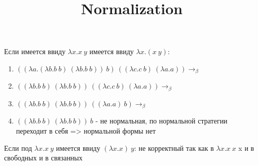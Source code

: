 \documentclass{article}
\title{Normalization}
\begin{document}
\maketitle

Если имеется ввиду $\lambda x.x\ y$ имеется ввиду $\lambda x.(x\ y)$:
\begin{enumerate} 
    \item $((\lambda a.(\lambda b.b\ b)\ (\lambda b.b\ b))\ b)\ ((\lambda c.c\ b)\ (\lambda a.a)) \to_\beta$
    \item $((\lambda b.b\ b)\ (\lambda b.b\ b))\ ((\lambda c.c\ b)\ (\lambda a.a)) \to_\beta$
    \item $((\lambda b.b\ b)\ (\lambda b.b\ b))\ ((\lambda a.a)\ b) \to_\beta$
    \item $((\lambda b.b\ b)\ (\lambda b.b\ b))\ b$ - не нормальная, по нормальной стратегии переходит в себя => нормальной формы нет
\end{enumerate} 


Если под $\lambda x.x\ y$ имеется ввиду $(\lambda x.x)\ y$:
не корректный так как в $\lambda x.x\ x$ x и в свободных и в связанных
\end{document}
